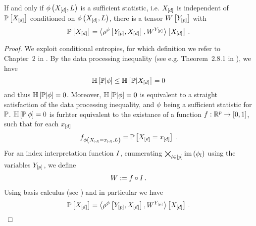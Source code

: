 \begin{theorem}\label{the:sufficientStatisticActCoreExistence}
    If and only if $\phi\left(X_{[d]},L\right)$ is a sufficient statistic, i.e. $X_{[d]}$ is independent of $\mathbb{P}\left[X_{[d]}\right]$ conditioned on $\phi\left(X_{[d]},L\right)$, there is a tensor $W\left[Y_{[p]}\right]$ with
    \begin{align*}
        \mathbb{P}\left[X_{[d]}\right] = \left\langle \rho^{\phi}\left[Y_{[p]},X_{[d]}\right],W^{Y_{[p]}}\right\rangle \left[ X_{[d]} \right] \, .
    \end{align*}
\end{theorem}
\begin{proof}
    We exploit conditional entropies, for which definition we refer to Chapter~2 in \cite{cover_elements_2006}. %
    By the data processing inequality (see e.g. Theorem~2.8.1 in \cite{cover_elements_2006}), we have
    \begin{align*}
        \mathbb{H}\left[\mathbb{P}|\phi\right] \leq \mathbb{H}\left[\mathbb{P} |X_{[d]}\right] = 0
    \end{align*}
    and thus $\mathbb{H}\left[\mathbb{P}|\phi\right]=0$.
    Moreover, $\mathbb{H}\left[\mathbb{P}|\phi\right]=0$ is equivalent to a straight satisfaction of the data processing inequality, and $\phi$ being a sufficient statistic for $\mathbb{P}$.
    $\mathbb{H}\left[\mathbb{P}|\phi\right]=0$ is furhter equivalent to the existance of a function $f:\mathbb{R}^{p}\rightarrow[0,1]$, such that for each $x_{[d]}$
    \begin{align*}
        f_{\phi\left(X_{[d]}=x_{[d]},L\right)} = \mathbb{P}\left[X_{[d]}=x_{[d]}\right] \, .
    \end{align*}
    For an index interpretation function $I$, enumerating $\bigtimes_{l\in[p]}\mathrm{im}\left(\phi_{l}\right)$ using the variables $Y_{[p]}$, we define
    \begin{align*}
        W := f \circ I \, .
    \end{align*}
    Using basis calculus (see ) and in particular  we have
    \begin{align*}
        \mathbb{P}\left[X_{[d]}\right] = \left\langle \rho^{\phi}\left[Y_{[p]},X_{[d]}\right],W^{Y_{[p]}}\right\rangle \left[ X_{[d]} \right] \, .
    \end{align*}
\end{proof}

